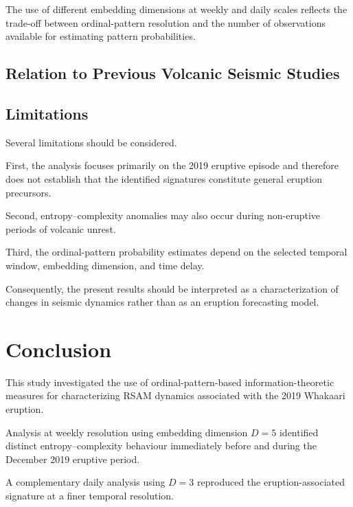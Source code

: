 \documentclass[journal]{IEEEtran}
\begin{document}
	The use of different embedding dimensions at weekly and daily
	scales reflects the trade-off between ordinal-pattern resolution
	and the number of observations available for estimating pattern
	probabilities.
	
	
	
	\subsection{Relation to Previous Volcanic Seismic Studies}
	
	
	
	\subsection{Limitations}
	
	Several limitations should be considered.
	
	First, the analysis focuses primarily on the 2019 eruptive
	episode and therefore does not establish that the identified
	signatures constitute general eruption precursors.
	
	Second, entropy--complexity anomalies may also occur during
	non-eruptive periods of volcanic unrest.
	
	Third, the ordinal-pattern probability estimates depend on the
	selected temporal window, embedding dimension, and time delay.
	
	Consequently, the present results should be interpreted as a
	characterization of changes in seismic dynamics rather than as
	an eruption forecasting model.
	
	
	\section{Conclusion}
	
	This study investigated the use of ordinal-pattern-based
	information-theoretic measures for characterizing RSAM dynamics
	associated with the 2019 Whakaari eruption.
	
	Analysis at weekly resolution using embedding dimension $D=5$
	identified distinct entropy--complexity behaviour immediately
	before and during the December 2019 eruptive period.
	
	A complementary daily analysis using $D=3$ reproduced the
	eruption-associated signature at a finer temporal resolution.
	
\end{document}
